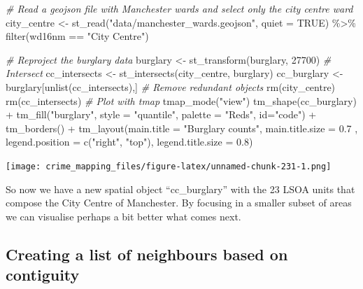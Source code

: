 \documentclass[
  krantz2]{krantz}
\makeatletter
\newenvironment{Shaded}{\begin{snugshade}}{\end{snugshade}}
\newcommand{\AttributeTok}[1]{\textcolor[rgb]{0.61,0.61,0.61}{#1}}
\newcommand{\CommentTok}[1]{\textcolor[rgb]{0.37,0.37,0.37}{\textit{#1}}}
\newcommand{\ConstantTok}[1]{\textcolor[rgb]{0,0,0}{#1}}
\newcommand{\DecValTok}[1]{\textcolor[rgb]{0.06,0.06,0.06}{#1}}
\newcommand{\FloatTok}[1]{\textcolor[rgb]{0.06,0.06,0.06}{#1}}
\newcommand{\FunctionTok}[1]{\textcolor[rgb]{0,0,0}{#1}}
\newcommand{\NormalTok}[1]{#1}
\newcommand{\OtherTok}[1]{\textcolor[rgb]{0.37,0.37,0.37}{#1}}
\newcommand{\SpecialCharTok}[1]{\textcolor[rgb]{0,0,0}{#1}}
\newcommand{\StringTok}[1]{\textcolor[rgb]{0.5,0.5,0.5}{#1}}
\newenvironment{kframe}{%
\medskip{}
\setlength{\fboxsep}{.8em}
 \def\at@end@of@kframe{}%
 \ifinner\ifhmode%
  \def\at@end@of@kframe{\end{minipage}}%
  \begin{minipage}{\columnwidth}%
 \fi\fi%
 \def\FrameCommand##1{\hskip\@totalleftmargin \hskip-\fboxsep
 \colorbox{shadecolor}{##1}\hskip-\fboxsep
     \hskip-\linewidth \hskip-\@totalleftmargin \hskip\columnwidth}%
 \MakeFramed {\advance\hsize-\width
   \@totalleftmargin\z@ \linewidth\hsize
   \@setminipage}}%
 {\par\unskip\endMakeFramed%
 \at@end@of@kframe}
\renewenvironment{Shaded}{\begin{kframe}}{\end{kframe}}
\makeatother
\begin{document}
\begin{Shaded}
\begin{Highlighting}[]
\CommentTok{\# Read a geojson file with Manchester wards and select only the city centre ward}
\NormalTok{city\_centre }\OtherTok{\textless{}{-}} \FunctionTok{st\_read}\NormalTok{(}\StringTok{"data/manchester\_wards.geojson"}\NormalTok{, }\AttributeTok{quiet =} \ConstantTok{TRUE}\NormalTok{) }\SpecialCharTok{\%\textgreater{}\%}
  \FunctionTok{filter}\NormalTok{(wd16nm }\SpecialCharTok{==} \StringTok{"City Centre"}\NormalTok{)}

\CommentTok{\# Reproject the burglary data}
\NormalTok{burglary }\OtherTok{\textless{}{-}} \FunctionTok{st\_transform}\NormalTok{(burglary, }\DecValTok{27700}\NormalTok{)}
\CommentTok{\# Intersect}
\NormalTok{cc\_intersects }\OtherTok{\textless{}{-}} \FunctionTok{st\_intersects}\NormalTok{(city\_centre, burglary)}
\NormalTok{cc\_burglary }\OtherTok{\textless{}{-}}\NormalTok{ burglary[}\FunctionTok{unlist}\NormalTok{(cc\_intersects),]}
\CommentTok{\# Remove redundant objects}
\FunctionTok{rm}\NormalTok{(city\_centre)}
\FunctionTok{rm}\NormalTok{(cc\_intersects)}
\CommentTok{\# Plot with tmap}
\FunctionTok{tmap\_mode}\NormalTok{(}\StringTok{"view"}\NormalTok{)}
\FunctionTok{tm\_shape}\NormalTok{(cc\_burglary) }\SpecialCharTok{+} 
  \FunctionTok{tm\_fill}\NormalTok{(}\StringTok{"burglary"}\NormalTok{, }\AttributeTok{style =} \StringTok{"quantile"}\NormalTok{, }\AttributeTok{palette =} \StringTok{"Reds"}\NormalTok{, }\AttributeTok{id=}\StringTok{"code"}\NormalTok{) }\SpecialCharTok{+}
  \FunctionTok{tm\_borders}\NormalTok{() }\SpecialCharTok{+}
  \FunctionTok{tm\_layout}\NormalTok{(}\AttributeTok{main.title =} \StringTok{"Burglary counts"}\NormalTok{, }\AttributeTok{main.title.size =} \FloatTok{0.7}\NormalTok{ ,}
            \AttributeTok{legend.position =} \FunctionTok{c}\NormalTok{(}\StringTok{"right"}\NormalTok{, }\StringTok{"top"}\NormalTok{), }\AttributeTok{legend.title.size =} \FloatTok{0.8}\NormalTok{)}
\end{Highlighting}
\end{Shaded}

\texttt{[image: crime\_mapping\_files/figure-latex/unnamed-chunk-231-1.png]}

So now we have a new spatial object ``cc\_burglary'' with the 23 LSOA units that compose the City Centre of Manchester. By focusing in a smaller subset of areas we can visualise perhaps a bit better what comes next.

\hypertarget{creating-a-list-of-neighbours-based-on-contiguity}{%
\subsection{Creating a list of neighbours based on contiguity}\label{creating-a-list-of-neighbours-based-on-contiguity}}
\end{document}
